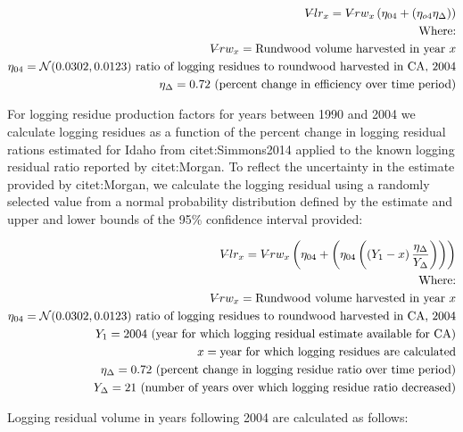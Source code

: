 \documentclass[a4paper]{article}
\begin{document}
\begin{align*}
V\llap{--}lr_{x} = V\llap{--}rw_{x}\left(\eta_{04}+\left(\eta_{o4}\eta_\Delta\right)\right)\\
\text{Where:}\\
V\llap{--}rw_{x} = \text{Rundwood volume harvested in year }x\\
\eta_{04} = \mathcal{N}(0.0302,0.0123) \text{ ratio of logging residues to roundwood harvested in CA, 2004}\\
\eta_\Delta = 0.72 \text{ (percent change in efficiency over time period)}\\
\end{align*}

For logging residue production factors for years between 1990 and 2004 we calculate logging residues as a function of the percent change in logging residual rations estimated for Idaho from citet:Simmons2014 applied to the known logging residual ratio reported by citet:Morgan. To reflect the uncertainty in the estimate provided by citet:Morgan, we calculate the logging residual using a randomly selected value from a normal probability distribution defined by the estimate and upper and lower bounds of the 95\% confidence interval provided:


\begin{align*}
V\llap{--}lr_{x} = V\llap{--}rw_{x}\left(\eta_{04}+ \left(\eta_{04}\left(\left(Y_1-x\right)\frac{\eta_\Delta}{Y_\Delta}\right)\right)\right)\\
\text{Where:}\\
V\llap{--}rw_{x} = \text{Rundwood volume harvested in year }x\\
\eta_{04} = \mathcal{N}(0.0302,0.0123) \text{ ratio of logging residues to roundwood harvested in CA, 2004}\\
Y_1 = 2004 \text{ (year for which logging residual estimate available for CA)} \\
x = \text{year for which logging residues are calculated}\\
\eta_\Delta = 0.72 \text{ (percent change in logging residue ratio over time period)}\\
Y_\Delta = 21\text{ (number of years over which logging residue ratio decreased)}
\end{align*}

Logging residual volume in years following 2004 are calculated as follows:
\end{document}
